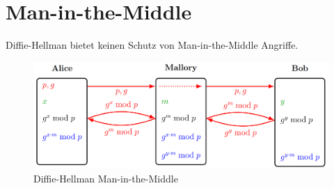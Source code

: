 \section{Man-in-the-Middle}
Diffie-Hellman bietet keinen Schutz von Man-in-the-Middle Angriffe.
\begin{figure}[H]
	\centering
	\includegraphics[width=1.0\linewidth]{figures/diffhell_mitm.png}
	\caption{Diffie-Hellman Man-in-the-Middle}
\end{figure}